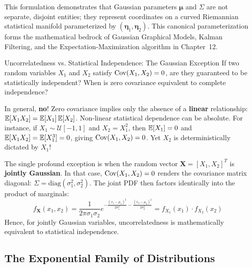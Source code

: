 This formulation demonstrates that Gaussian parameters $\boldsymbol{\mu}$ and $\Sigma$ are not separate, disjoint entities; they represent coordinates on a curved Riemannian statistical manifold parameterized by $(\boldsymbol{\eta}_1, \boldsymbol{\eta}_2)$. This canonical parameterization forms the mathematical bedrock of Gaussian Graphical Models, Kalman Filtering, and the Expectation-Maximization algorithm in Chapter~12.

\begin{ponderbox}{Uncorrelatedness vs. Statistical Independence: The Gaussian Exception}
If two random variables $X_1$ and $X_2$ satisfy $\operatorname{Cov}(X_1, X_2) = 0$, are they guaranteed to be statistically independent? When is zero covariance equivalent to complete independence?

\tcblower
In general, \textbf{no}! Zero covariance implies only the absence of a \textbf{linear} relationship: $\operatorname{\mathbb{E}}[X_1 X_2] = \operatorname{\mathbb{E}}[X_1]\operatorname{\mathbb{E}}[X_2]$. Non-linear statistical dependence can be absolute. For instance, if $X_1 \sim \mathcal{U}[-1, 1]$ and $X_2 = X_1^2$, then $\operatorname{\mathbb{E}}[X_1] = 0$ and $\operatorname{\mathbb{E}}[X_1 X_2] = \operatorname{\mathbb{E}}[X_1^3] = 0$, giving $\operatorname{Cov}(X_1, X_2) = 0$. Yet $X_2$ is deterministically dictated by $X_1$!

The single profound exception is when the random vector $\mathbf{X} = [X_1, X_2]^T$ is \textbf{jointly Gaussian}. In that case, $\operatorname{Cov}(X_1, X_2) = 0$ renders the covariance matrix diagonal: $\Sigma = \text{diag}(\sigma_1^2, \sigma_2^2)$. The joint PDF then factors identically into the product of marginals:
\begin{equation*}
f_{\mathbf{X}}(x_1, x_2) = \frac{1}{2\pi \sigma_1 \sigma_2} e^{-\frac{(x_1-\mu_1)^2}{2\sigma_1^2} - \frac{(x_2-\mu_2)^2}{2\sigma_2^2}} = f_{X_1}(x_1) \cdot f_{X_2}(x_2)
\end{equation*}
Hence, for jointly Gaussian variables, uncorrelatedness is mathematically equivalent to statistical independence.
\end{ponderbox}

\subsection{The Exponential Family of Distributions}

